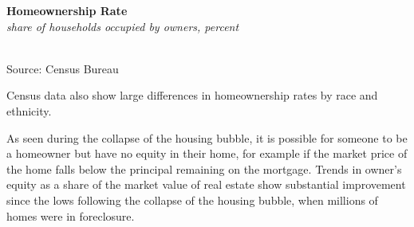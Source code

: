\documentclass{report}
\makeatletter
\newcommand{\tbllink}[1]{\href{https://raw.githubusercontent.com/bdecon/US-chartbook/master/chartbook/data/#1}{\faTable}}
\newcommand*\short[1]{\expandafter\@gobbletwo\number\numexpr#1\relax}
\newcommand{\stdnode}[3]{\node[below, align=left, shift=({#1,#2})]{#3};}
\newcommand{\shdateaxisticks}{
		date coordinates in=x, axis line style={draw=none},
		xmax={2021-02-01},
		max space between ticks=40,	    
		xtick={{1990-01-01}, {1995-01-01}, {2000-01-01}, 
			{2005-01-01}, {2010-01-01}, {2015-01-01}, {2020-01-01}},
		minor xtick={},
		enlarge y limits={0.06}, enlarge x limits={0.01},
		}
\newcommand{\stdline}[4]{\addplot[very thick, no markers, color=#1] 
		table [x=#2, y=#3, col sep=comma] {#4};	}
\newcommand{\rbars}{
		\fill[color=black!10] (axis cs:{1990-07-01},\pgfkeysvalueof{/pgfplots/ymin}) rectangle 
			(axis cs:{1991-03-01}, \pgfkeysvalueof{/pgfplots/ymax});
		\fill[color=black!10] (axis cs:{2007-12-01},\pgfkeysvalueof{/pgfplots/ymin}) rectangle 
			(axis cs:{2009-07-01}, \pgfkeysvalueof{/pgfplots/ymax});
		\fill[color=black!10] (axis cs:{2001-03-01},\pgfkeysvalueof{/pgfplots/ymin}) rectangle 
			(axis cs:{2001-11-01}, \pgfkeysvalueof{/pgfplots/ymax});}
\makeatother
\begin{document}
{{{{\begin{minipage}{0.405\textwidth}
\noindent \normalsize \textbf{Homeownership Rate}\\
\footnotesize{\textit{share of households occupied by owners, percent}}\\
\noindent \hspace*{-2mm} \\
\footnotesize{Source: Census Bureau} \hspace{26mm} \tbllink{homeown2.csv} 

\end{minipage}\hspace{5.5mm}
\begin{minipage}{0.31\textwidth}
\small Census data also show large differences in homeownership rates by race and ethnicity.  \\


\end{minipage}\hspace{5mm}

\vspace{3mm}

\begin{minipage}{0.76\textwidth}

\small

As seen during the collapse of the housing bubble, it is possible for someone to be a homeowner but have no equity in their home, for example if the market price of the home falls below the principal remaining on the mortgage. Trends in owner's equity as a share of the market value of real estate show substantial improvement since the lows following the collapse of the housing bubble, when millions of homes were in foreclosure. 


\end{minipage}}}}}
\end{document}

